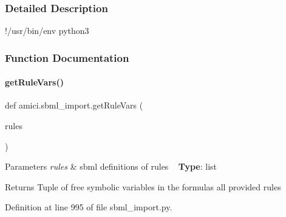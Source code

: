 \subsubsection{Detailed Description}
!/usr/bin/env python3 

\subsubsection{Function Documentation}
\mbox{\label{namespaceamici_1_1sbml__import_a64a5d0187cb4b3f69bceceb7d5638691}} 
\paragraph{\texorpdfstring{get\+Rule\+Vars()}{getRuleVars()}}
{\footnotesize\ttfamily def amici.\+sbml\+\_\+import.\+get\+Rule\+Vars (\begin{DoxyParamCaption}\item[{}]{rules }\end{DoxyParamCaption})}


\begin{DoxyParams}{Parameters}
{\em rules} & sbml definitions of rules ~\newline
{\bfseries Type}\+: list\\
\hline
\end{DoxyParams}
\begin{DoxyReturn}{Returns}
Tuple of free symbolic variables in the formulas all provided rules 
\end{DoxyReturn}


Definition at line 995 of file sbml\+\_\+import.\+py.

